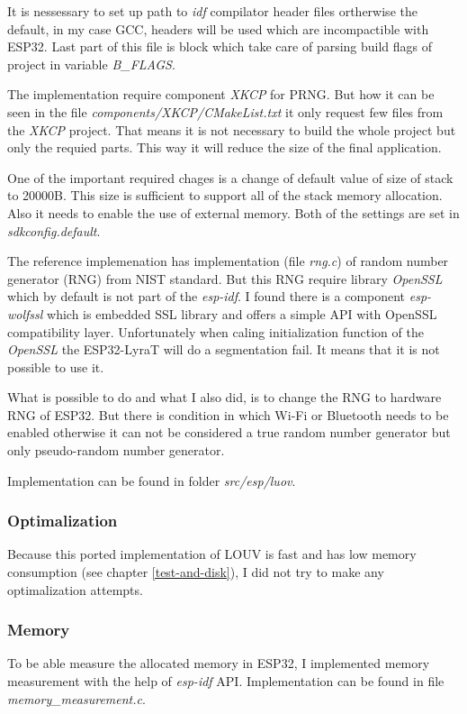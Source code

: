 \documentclass[thesis=M,english]{FITthesis}[2019/12/23]
\begin{document}
\noindent
It is nessessary to set up path to \textit{idf} compilator header files ortherwise the default, in my case GCC, headers will be used which are incompactible with ESP32.
Last part of this file is block which take care of parsing build flags of project in variable \textit{B\_FLAGS}. 

\bigskip
\noindent
The implementation require component \textit{XKCP} for PRNG. But how it can be seen in the file \textit{components/XKCP/CMakeList.txt} it only request few files from the \textit{XKCP} project. That means it is not necessary to build the whole project but only the requied parts. This way it will reduce the size of the final application. 

\bigskip
\noindent
One of the important required chages is a change of default value of size of stack to 20000B. This size is sufficient to support all of the stack memory allocation. Also it needs to enable the use of external memory. Both of the settings are set in \textit{sdkconfig.default}.

\bigskip
\noindent
The reference implemenation has implementation (file \textit{rng.c}) of random number generator (RNG) from NIST standard. But this RNG require library \textit{OpenSSL} which by default is not part of the \textit{esp-idf}. I found there is a component \textit{esp-wolfssl} which is embedded SSL library and offers a simple API with OpenSSL compatibility layer. Unfortunately when caling initialization function of the \textit{OpenSSL} the ESP32-LyraT will do a segmentation fail. It means that it is not possible to use it.

\bigskip
\noindent
What is possible to do and what I also did, is to change the RNG to hardware RNG of ESP32. But there is condition in which Wi-Fi or Bluetooth needs to be enabled otherwise it can not be considered a true random number generator but only pseudo-random number generator.

\bigskip
\noindent
Implementation can be found in folder \textit{src/esp/luov}. 

\subsubsection{Optimalization}
Because this ported implementation of LOUV is fast and has low memory consumption (see chapter \ref{test-and-disk}), I did not try to make any optimalization attempts. 

\subsubsection{Memory}
To be able measure the allocated memory in ESP32, I implemented memory measurement with the help of \textit{esp-idf} API. Implementation can be found in file \textit{memory\_measurement.c}.
\end{document}
